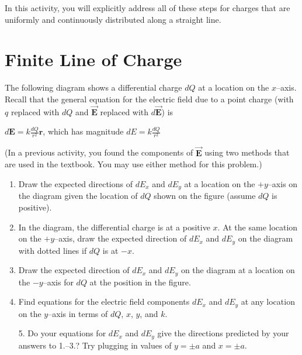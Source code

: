\documentclass{article}
\newcommand{\bfvec}[1]{\vec{\mathbf{#1}}}
\begin{document}
In this activity, you will explicitly address all of these steps for charges that are uniformly and continuously distributed along a straight line.

\section{Finite Line of Charge}

The following diagram shows a differential charge $dQ$ at a location on the $x$--axis. Recall that the general equation for the electric field due to a point charge (with $q$ replaced with $dQ$ and $\bfvec{E}$ replaced with $d\bfvec{E}$) is

$\displaystyle d\mathbf{E} =k\frac{dQ}{r^2}\hat{\mathbf{r}}$, which has magnitude $\displaystyle dE = k\frac{dQ}{r^2}$

(In a previous activity, you found the components of $\bfvec{E}$ using two methods that are used in the textbook. You may use either method for this problem.)



\begin{enumerate}

  \item Draw the expected directions of $dE_x$ and $dE_y$ at a location on the $+y$--axis on the diagram given the location of $dQ$ shown on the figure (assume $dQ$ is positive).

  \item In the diagram, the differential charge is at a positive $x$. At the same location on the $+y$--axis, draw the expected direction of $dE_x$ and $dE_y$ on the diagram with dotted lines if $dQ$ is at $-x$.

  \item Draw the expected direction of $dE_x$ and $dE_y$ on the diagram at a location on the $-y$--axis for $dQ$ at the position in the figure.

  \item Find equations for the electric field components $dE_x$ and $dE_y$ at any location on the $y$--axis in terms of $dQ$, $x$, $y$, and $k$.

\end{enumerate}

\vskip 96.36pt

\begin{enumerate}

  \item[5.] Do your equations for $dE_x$ and $dE_y$ give the directions predicted by your answers to 1.--3.? Try plugging in values of $y=\pm a$ and $x=\pm a$.

\end{enumerate}
\end{document}
